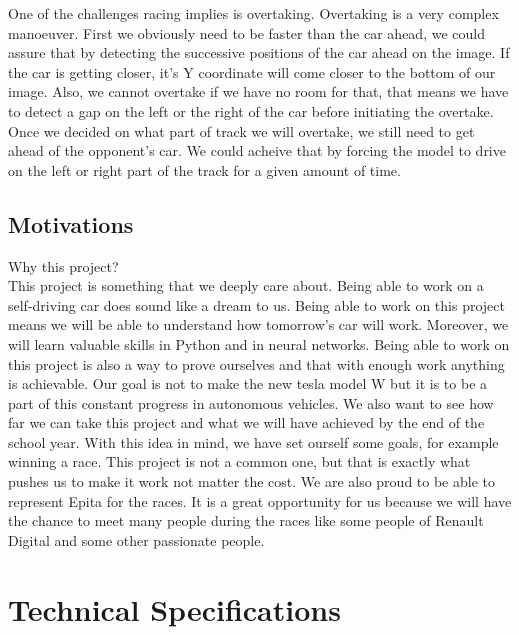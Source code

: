 \documentclass[12pt]{article}
\begin{document}
One of the challenges racing implies is overtaking. Overtaking is a very complex manoeuver. First we obviously need to be faster than the car ahead, we could assure that by detecting the successive positions of the car ahead on the image. If the car is getting closer, it's Y coordinate will come closer to the bottom of our image. Also, we cannot overtake if we have no room for that, that means we have to detect a gap on the left or the right of the car before initiating the overtake. Once we decided on what part of track we will overtake, we still need to get ahead of the opponent's car. We could acheive that by forcing the model to drive on the left or right part of the track for a given amount of time.
\newpage

\subsection{Motivations}
Why this project? \\
This project is something that we deeply care about. Being able to work on a self-driving car does sound like a dream to us. Being able to work on this project means we will be able to understand how tomorrow's car will work. Moreover, we will learn valuable skills in Python and in neural networks. 
Being able to work on this project is also a way to prove ourselves and that with enough work anything is achievable.
Our goal is not to make the new tesla model W but it is to be a part of this constant progress in autonomous vehicles. We also want to see how far we can take this project and what we will have achieved by the end of the school year. With this idea in mind, we have set ourself some goals, for example winning a race. This project is not a common one, but that is exactly what pushes us to make it work not matter the cost. We are also proud to be able to represent Epita for the races. 
It is a great opportunity for us because we will have the chance to meet many people during the races like some people of Renault Digital and some other passionate people.

\section{Technical Specifications}
\end{document}
